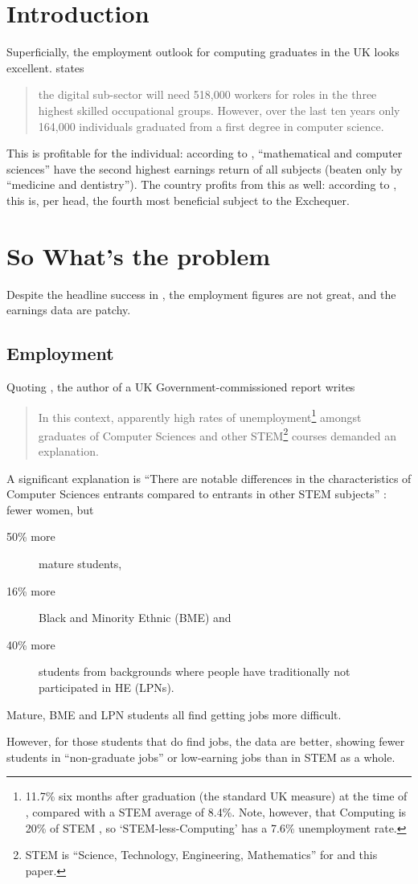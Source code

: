 \documentclass[sigconf]{acmart}
\begin{document}
\section{Introduction}
Superficially, the employment outlook for computing graduates in the UK looks excellent. \cite[p.~74]{UKCES2015b} states
\begin{quote}
the digital sub-sector will need 518,000 workers for roles in the three highest skilled occupational groups. However, over the last ten years only 164,000 individuals graduated from a first degree in computer science.
\end{quote}
This is profitable for the individual: according to \cite[Figure 4]{BIS2011a}, ``mathematical and computer sciences'' have the second highest earnings return of all subjects (beaten only by ``medicine and dentistry'').
The country profits from this as well: according to
\cite[p.~16]{BIS2011a}, this is, per head, the fourth most beneficial
subject to the Exchequer.

\section{So What's the problem}
Despite the headline success in \cite{BIS2011a}, the employment
figures are not great, and the earnings data are patchy.

\subsection{Employment}
Quoting \cite{UKCES2015b}, the author of a UK Government-commissioned report \cite{Shadbolt2016a} writes
\begin{quote}
In this context, apparently high rates of unemployment\footnote{11.7\% six months after graduation (the standard UK measure) at the time of \cite{Shadbolt2016a}, compared with a STEM average of 8.4\%. Note, however, that Computing is 20\% of STEM \cite[Table 1]{Wakeham2016a}, so `STEM-less-Computing' has a 7.6\% unemployment rate.} amongst graduates of Computer Sciences and other STEM\footnote{STEM is ``Science, Technology, Engineering, Mathematics'' for \cite{Shadbolt2016a} and this paper.} courses demanded an explanation. 
\end{quote}
A significant explanation is ``There are notable differences in the characteristics of Computer Sciences entrants compared to entrants in other STEM subjects'' \cite[\P2.6]{Shadbolt2016a}: fewer women, but
\begin{description}
\item[50\% more] mature students,
\item[16\% more]Black and Minority Ethnic (BME) and 
\item[40\% more]students from backgrounds where people have traditionally not participated in HE (LPNs).
\end{description}
Mature, BME and LPN students all find getting jobs more difficult.
\par
However, for those students that do find jobs, the data are better,
showing \cite[Figure 6]{Shadbolt2016a} fewer students in
``non-graduate jobs'' or low-earning jobs than in STEM as a whole.
\end{document}
